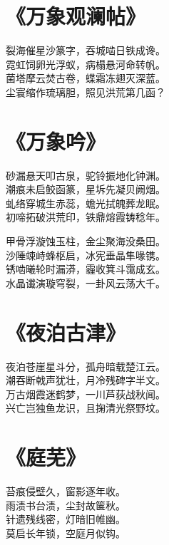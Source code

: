

\section{《万象观澜帖》}

裂海催星沙篆字，吞城啮日铁成谗。 \\
霓虹饲卵光浮蚁，病榻悬河命转帆。 \\
菌塔摩云焚古卷，蝶霜冻翅灭深蓝。 \\
尘寰缩作琉璃胆，照见洪荒第几函？

\clearpage


\section{《万象吟》}

砂漏悬天叩古泉，驼铃振地化钟渊。 \\
潮痕未启鲛函篆，星坼先凝贝阙烟。 \\
虬络穿城生赤蕊，蟾光拭魄葬龙眠。 \\
初啼拓破洪荒印，铁鼎熔霞铸稔年。
\vspace{1em}

甲骨浮漩蚀玉柱，金尘聚海没桑田。 \\
沙陲竦峙蜂枢启，冰宪垂晶隼喙镌。 \\
锈啮曦轮时漏漭，霾收箕斗霭成玄。 \\
水晶谶演璇穹裂，一卦风云荡大千。

\clearpage


\section{《夜泊古津》}

夜泊苍崖星斗分，孤舟暗载楚江云。 \\
潮吞断戟声犹壮，月冷残碑字半文。 \\
万古烟霞迷鹤梦，一川芦荻战秋闻。 \\
兴亡岂独鱼龙识，且掬清光祭野坟。

\clearpage


\section{《庭芜》}

苔痕侵壁久，窗影逐年收。 \\
雨渍书台渍，尘封故箧秋。 \\
针遗残线密，灯暗旧帷幽。 \\
莫启长年锁，空庭月似钩。

